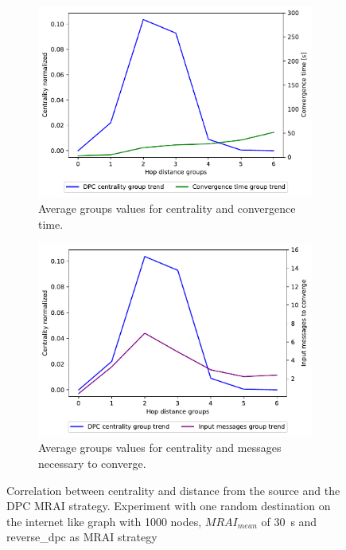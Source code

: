 \documentclass[10pt,conference,letterpaper]{IEEEtran}
\newcommand{\figwidth}{0.78}
\newcommand{\figvspace}{-1.5em}
\begin{document}
\begin{figure}[tb]
	\centering

	\begin{subfigure}{\columnwidth}
		\centering
		\includegraphics[width=\figwidth\columnwidth]{images/different_destinations/1000-reverse_dpc-d0_node-conv_MRAI30_centVStime_trend.pdf}
		\caption{Average groups values for centrality and convergence time.}
		\label{fig:1000-reverse-dpc_node_conv_centVStime_trend}
		\qquad
	\end{subfigure}

	\begin{subfigure}{\columnwidth}
		\centering
		\includegraphics[width=\figwidth\columnwidth]{images/different_destinations/1000-reverse_dpc-d0_node-conv_MRAI30_centVSmsg_trend.pdf}
		\caption{Average groups values for centrality and messages necessary to converge.}
		\label{fig:1000-reverse-dpc_node_conv_centVSmsg_trend}
		\qquad
	\end{subfigure}

	\caption{Correlation between centrality and distance from the source and the \ac{DPC} \ac{MRAI} strategy.
			 Experiment with one random destination on the internet like graph with
			 \num{1000} nodes, $MRAI_{mean}$ of \SI{30}{\second} and reverse\_dpc as
			 \ac{MRAI} strategy}
	\label{fig:1000-reverse-dpc_node_conv_trend}
	\vspace{\figvspace}
\end{figure}
\end{document}
